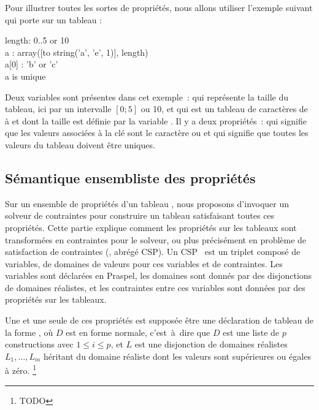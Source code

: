 \begin{example}
\label{example:data:array_proprietes}
Pour illustrer toutes les sortes de propriétés, nous allons utiliser l'exemple
suivant qui porte sur un tableau :

\begin{pre}
length: 0..5 or 10 \\
a     : array([to string('a', 'e', 1)], length) \\
a[0]  : 'b' or 'c' \\
a is unique
\end{pre}

Deux variables sont présentes dans cet exemple~:  qui représente la
taille du tableau, ici par un intervalle $[0; 5]$ ou 10, et  qui est un
tableau de caractères de  à  et dont la taille est définie par
la variable . Il y a deux propriétés~:  qui
signifie que les valeurs associées à la clé  sont le caractère
 ou  et  qui signifie que toutes les
valeurs du tableau doivent être uniques.

\end{example}

\subsection{Sémantique ensembliste des propriétés}
\label{subsection:data:solver_semantics}

Sur un ensemble de propriétés d'un tableau , nous proposons d'invoquer
un solveur de contraintes pour construire un tableau satisfaisant toutes ces
propriétés. Cette partie explique comment les propriétés sur les tableaux sont
transformées en contraintes pour le solveur, ou plus précisément en problème de
satisfaction de contraintes (, abrégé
CSP). Un CSP~ est un triplet composé de variables, de domaines de
valeurs pour ces variables et de contraintes. Les variables sont déclarées en
Praspel, les domaines sont donnés par des disjonctions de domaines réalistes, et
les contraintes entre ces variables sont données par des propriétés sur les
tableaux.

Une et une seule de ces propriétés est supposée être une déclaration de tableau
de la forme , où $D$ est en forme normale, c'est~à~dire
que $D$ est une liste de $p$ constructions  avec $1
\leq i \leq p$, et $L$ est une disjonction de domaines réalistes $L_1, \dots,
L_m$ héritant du domaine réaliste  dont les valeurs sont
supérieures ou égales à zéro.
\footnote{TODO}

